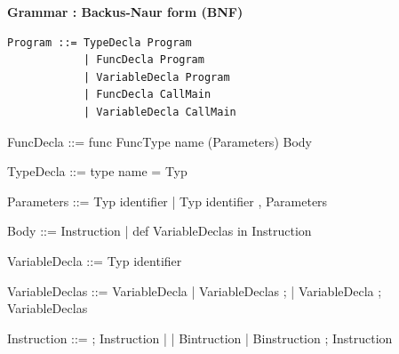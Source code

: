 \documentclass[11pt]{report}
\begin{document}
\newpage
\centerline{\textbf{\Huge Grammar : Backus-Naur form (BNF)}}
\vspace*{20 pt}
\vspace*{3pt}
\begin{Verbatim}[fontfamily=textsf]
Program ::= TypeDecla Program
            | FuncDecla Program
            | VariableDecla Program
            | FuncDecla CallMain
            | VariableDecla CallMain
\end{Verbatim}
\vspace*{3pt}

\begin{verbnobox}[\normalfont]
FuncDecla ::= func FuncType name (Parameters) Body
\end{verbnobox}
\vspace*{3pt}

\begin{verbnobox}[\normalfont]
TypeDecla ::= type name = Typ
\end{verbnobox}
\vspace*{3pt}

\begin{verbnobox}[\normalfont]
Parameters ::= Typ identifier | Typ identifier , Parameters
\end{verbnobox}
\vspace*{3pt}

\begin{verbnobox}[\normalfont]
Body ::= { Instruction } | { def VariableDeclas in Instruction }
\end{verbnobox}
\vspace*{3pt}

\begin{verbnobox}[\normalfont]
VariableDecla ::= Typ identifier
\end{verbnobox}
\vspace*{3pt}

\begin{verbnobox}[\normalfont]
VariableDeclas ::= VariableDecla 
                    | VariableDeclas ; 
                    | VariableDecla ; VariableDeclas
\end{verbnobox}
\vspace*{3pt}

\begin{verbnobox}[\normalfont]
Instruction ::= ; Instruction
               |
               | Bintruction 
               | Binstruction ; Instruction
\end{verbnobox}
\vspace*{3pt}
\end{document}
